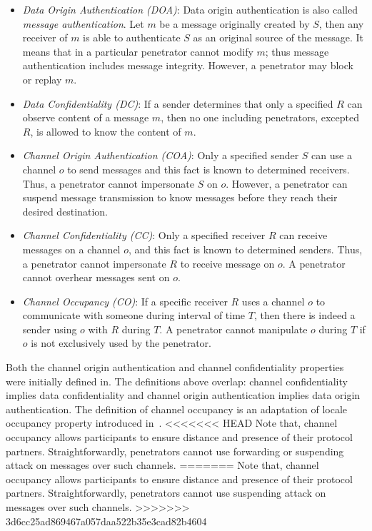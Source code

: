 \begin{itemize}
\item \emph{Data Origin Authentication (DOA)}: Data origin authentication is also called \emph{message authentication}. Let $m$ be a message originally created by $S$, then any receiver of $m$ is able to authenticate $S$ as an original source of the message. It means that in a particular penetrator cannot modify $m$; thus message authentication includes message integrity. However, a penetrator may block or replay $m$. 
\item \emph{Data Confidentiality (DC)}: If a sender determines that only a specified $R$ can observe content of a message $m$, then no one including penetrators, excepted $R$, is allowed to know the content of $m$.
\item \emph{Channel Origin Authentication (COA)}: Only a specified sender $S$ can use a channel $o$ to send messages and this fact is known to determined receivers. Thus, a penetrator cannot impersonate $S$ on $o$. However, a penetrator can suspend message transmission to know messages before they reach their desired destination. 
\item \emph{Channel Confidentiality (CC)}: Only a specified receiver $R$ can receive messages on a channel $o$, and this fact is known to determined senders. Thus, a penetrator cannot impersonate $R$ to receive message on $o$. A penetrator cannot overhear messages sent on $o$.
\item \emph{Channel Occupancy (CO)}: If a specific receiver $R$ uses a channel $o$ to communicate with someone during interval of time $T$, then there is indeed a sender using $o$ with $R$ during $T$. A penetrator cannot manipulate $o$ during $T$ if $o$ is not exclusively used by the penetrator.
\end{itemize} 

Both the channel origin authentication and channel confidentiality properties were initially defined in\cite{Mausch94}. The definitions above overlap: channel confidentiality implies data confidentiality and channel origin authentication implies data origin authentication. The definition of channel occupancy is an adaptation of locale occupancy property introduced in~\cite{Thayer:2010aa}.
<<<<<<< HEAD
Note that, channel occupancy allows participants to ensure distance and presence of their protocol partners. Straightforwardly, penetrators cannot use forwarding or suspending attack on messages over such channels.
=======
Note that, channel occupancy allows participants to ensure distance and presence of their protocol partners. Straightforwardly, penetrators cannot use suspending attack on messages over such channels.
>>>>>>> 3d6cc25ad869467a057daa522b35e3cad82b4604

